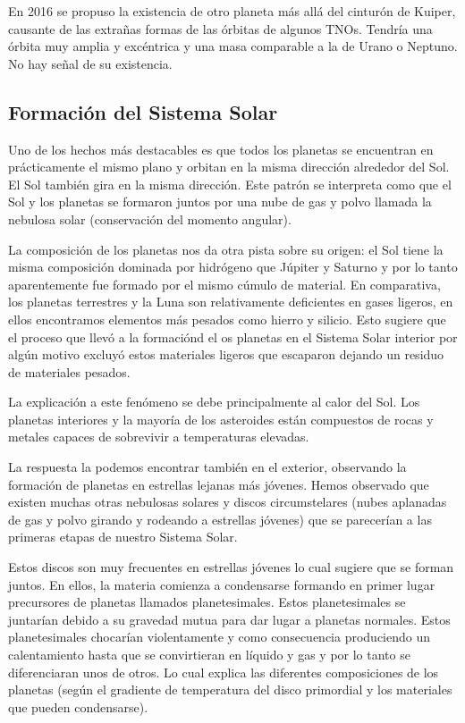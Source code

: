 \documentclass{tufte-handout}
\begin{document}
En 2016 se propuso la existencia de otro planeta más allá del cinturón de Kuiper, causante de las extrañas formas de las órbitas de algunos TNOs. Tendría una órbita muy amplia y excéntrica y una masa comparable a la de Urano o Neptuno. No hay señal de su existencia.

\subsection{Formación del Sistema Solar}

Uno de los hechos más destacables es que todos los planetas se encuentran en prácticamente el mismo plano y orbitan en la misma dirección alrededor del Sol. El Sol también gira en la misma dirección. Este patrón se interpreta como que el Sol y los planetas se formaron juntos por una nube de gas y polvo llamada la nebulosa solar (conservación del momento angular).

La composición de los planetas nos da otra pista sobre su origen: el Sol tiene la misma composición dominada por hidrógeno que Júpiter y Saturno y por lo tanto aparentemente fue formado por el mismo cúmulo de material. En comparativa, los planetas terrestres y la Luna son relativamente deficientes en gases ligeros, en ellos encontramos elementos más pesados como hierro y silicio. Esto sugiere que el proceso que llevó a la formaciónd el os planetas en el Sistema Solar interior por algún motivo excluyó estos materiales ligeros que escaparon dejando un residuo de materiales pesados.

La explicación a este fenómeno se debe principalmente al calor del Sol. Los planetas interiores y la mayoría de los asteroides están compuestos de rocas y metales capaces de sobrevivir a temperaturas elevadas.

La respuesta la podemos encontrar también en el exterior, observando la formación de planetas en estrellas lejanas más jóvenes. Hemos observado que existen muchas otras nebulosas solares y discos circumstelares (nubes aplanadas de gas y polvo girando y rodeando a estrellas jóvenes) que se parecerían a las primeras etapas de nuestro Sistema Solar.

Estos discos son muy frecuentes en estrellas jóvenes lo cual sugiere que se forman juntos. En ellos, la materia comienza a condensarse formando en primer lugar precursores de planetas llamados planetesimales. Estos planetesimales se juntarían debido a su gravedad mutua para dar lugar a planetas normales. Estos planetesimales chocarían violentamente y como consecuencia produciendo un calentamiento hasta que se convirtieran en líquido y gas y por lo tanto se diferenciaran unos de otros. Lo cual explica las diferentes composiciones de los planetas (según el gradiente de temperatura del disco primordial y los materiales que pueden condensarse).
\end{document}
